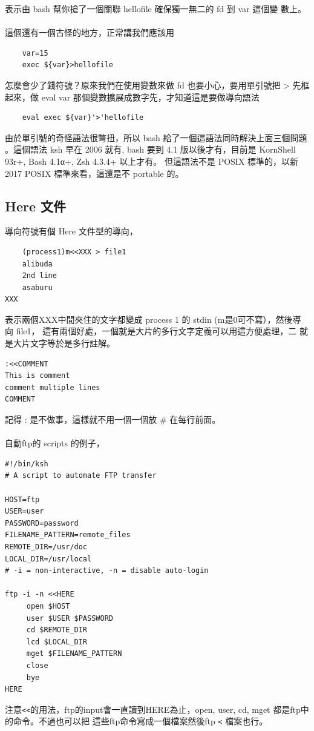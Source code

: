     表示由 bash 幫你搶了一個關聯 hellofile 確保獨一無二的 fd 到 var 這個變
    數上。
    \\\\
    這個還有一個古怪的地方，正常講我們應該用
    \begin{verbatim}
    var=15
    exec ${var}>hellofile
    \end{verbatim}
    怎麼會少了錢符號？原來我們在使用變數來做 fd 也要小心，要用單引號把
    > 先框起來，做 eval var 那個變數擴展成數字先，才知道這是要做導向語法
    \begin{verbatim}
    eval exec ${var}'>'hellofile
    \end{verbatim}
    由於單引號的奇怪語法很彆扭，所以 bash 給了一個這語法同時解決上面三個問題
    。這個語法 ksh 早在 2006 就有, bash 要到 4.1 版以後才有，目前是
    KornShell 93r+, Bash 4.1α+, Zsh 4.3.4+ 以上才有。
    但這語法不是 POSIX 標準的，以新 2017 POSIX 標準來看，這還是不 portable
    的。

    \subsection{Here 文件}
    導向符號有個 Here 文件型的導向，
    \begin{verbatim}
    (process1)m<<XXX > file1
    alibuda
    2nd line
    asaburu
XXX
    \end{verbatim}
    表示兩個XXX中間夾住的文字都變成 process 1 的 stdin (m是0可不寫），然後導
    向 file1， 這有兩個好處，一個就是大片的多行文字定義可以用這方便處理，二
    就是大片文字等於是多行註解。
    \begin{verbatim}
:<<COMMENT
This is comment
comment multiple lines
COMMENT
    \end{verbatim}
    記得 : 是不做事，這樣就不用一個一個放 \# 在每行前面。
    \\\\
    自動ftp的 scripts 的例子，
    \begin{verbatim}
#!/bin/ksh
# A script to automate FTP transfer

HOST=ftp
USER=user
PASSWORD=password
FILENAME_PATTERN=remote_files
REMOTE_DIR=/usr/doc
LOCAL_DIR=/usr/local
# -i = non-interactive, -n = disable auto-login

ftp -i -n <<HERE
     open $HOST
     user $USER $PASSWORD
     cd $REMOTE_DIR
     lcd $LOCAL_DIR
     mget $FILENAME_PATTERN
     close
     bye
HERE
    \end{verbatim}
    注意\verb=<<=的用法，ftp的input會一直讀到HERE為止，open, user, cd, mget
    都是ftp中的命令。不過也可以把
    這些ftp命令寫成一個檔案然後ftp \verb=<= 檔案也行。
